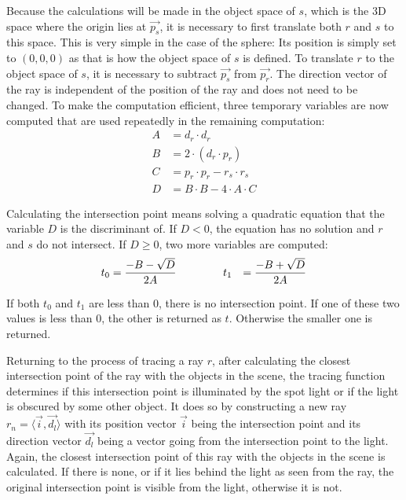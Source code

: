 \documentclass[11pt]{report}
\begin{document}
Because the calculations will be made in the object space of $s$, which is the 3D space where the origin lies at $\vec{p_s}$, it is necessary to first translate both $r$ and $s$ to this space. This is very simple in the case of the sphere: Its position is simply set to $(0,0,0)$ as that is how the object space of $s$ is defined. To translate $r$ to the object space of $s$, it is necessary to subtract $\vec{p_s}$ from $\vec{p_r}$. The direction vector of the ray is independent of the position of the ray and does not need to be changed. To make the computation efficient, three temporary variables are now computed that are used repeatedly in the remaining computation:
\begin{equation*}
\begin{aligned}
A &= d_r \cdot d_r\\
B &= 2 \cdot (d_r \cdot p_r)\\
C &= p_r \cdot p_r - r_s \cdot r_s\\
D &= B \cdot B - 4 \cdot A \cdot C
\end{aligned}
\end{equation*}

Calculating the intersection point means solving a quadratic equation that the variable $D$ is the discriminant of. If $D < 0$, the equation has no solution and $r$ and $s$ do not intersect. If $D \geq 0$, two more variables are computed:
\begin{equation*}
\begin{aligned}
t_0 &= \frac{-B-\sqrt{D}}{2 A}\hspace{1.5cm}
t_1 &= \frac{-B+\sqrt{D}}{2 A}
\end{aligned}
\end{equation*}

If both $t_0$ and $t_1$ are less than $0$, there is no intersection point. If one of these two values is less than $0$, the other is returned as $t$. Otherwise the smaller one is returned.

Returning to the process of tracing a ray $r$, after calculating the closest intersection point of the ray with the objects in the scene, the tracing function determines if this intersection point is illuminated by the spot light or if the light is obscured by some other object. It does so by constructing a new ray $r_n = \langle \vec{i}, \vec{d_l} \rangle$ with its position vector $\vec{i}$ being the intersection point and its direction vector $\vec{d_l}$ being a vector going from the intersection point to the light. Again, the closest intersection point of this ray with the objects in the scene is calculated. If there is none, or if it lies behind the light as seen from the ray, the original intersection point is visible from the light, otherwise it is not.
\end{document}
